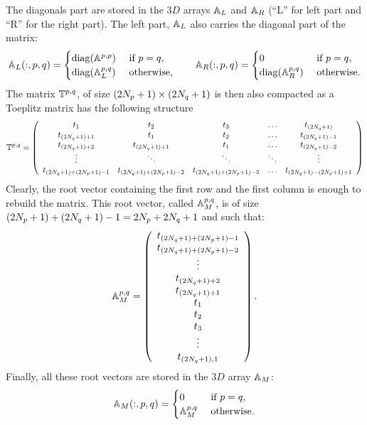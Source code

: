 The diagonals part are stored in the $3D$ arrays ${\mathbb{A}}_L$ and ${\mathbb{A}}_R$ (``L'' for left part and ``R'' for the right part). The left part, ${\mathbb{A}}_L$ also carries the diagonal part of the matrix:
$$
{\mathbb{A}}_L(:,p,q) = \begin{cases}
{\rm diag}(\mathbb{A}^{p,p}) & \text{ if }p=q,\\
{\rm diag}({\mathbb{A}}_L^{p,q}) & \text{ otherwise,}
\end{cases}\qquad
{\mathbb{A}}_R(:,p,q) = \begin{cases}
0 & \text{ if }p=q,\\
{\rm diag}({\mathbb{A}}_R^{p,q}) & \text{ otherwise.}
\end{cases}
$$
The matrix $\mathbb{T}^{p,q}$, of size $(2N_{p}+1) \times (2N_{q}+1)$ is then also compacted as a Toeplitz matrix has the following structure
$$
\mathbb{T}^{p,q} = \left(\begin{array}{c c c c c}
t_1 & t_2 & t_3 & \ldots & t_{(2N_{q}+1)} \\
t_{(2N_{q}+1)+1} & t_{1} & t_{2} & \ldots & t_{(2N_{q}+1)-1}\\
t_{(2N_{q}+1)+2} & t_{(2N_{q}+1)+1} & t_{1} & \ldots & t_{(2N_{q}+1)-2}\\
\vdots & \ddots & \ddots& \ddots& \vdots\\
t_{(2N_{q}+1)+(2N_{p}+1)-1} & t_{(2N_{q}+1)+(2N_{p}+1)-2} & t_{(2N_{q}+1)+(2N_{p}+1)-3} &   \ldots  & t_{(2N_{q}+1)-(2N_{p}+1)+1}
\end{array}\right)
$$
Clearly, the root vector containing the first row and the first column is enough to rebuild the matrix. This root vector, called ${\mathbb{A}}_M^{p,q}$, is of size $(2N_{p}+1)+ (2N_{q}+1)-1 = 2N_{p} +2N_{q}+1$ and such that:
$$
{\mathbb{A}}_M^{p,q} = \left(\begin{array}{c}
t_{(2N_{q}+1)+(2N_{p}+1)-1}\\
t_{(2N_{q}+1)+(2N_{p}+1)-2}\\
\vdots\\
t_{(2N_{q}+1)+2}\\
t_{(2N_{q}+1)+1}\\
t_{1}\\
t_{2}\\
t_{3} \\
\vdots\\
t_{(2N_{q}+1), 1}\\
\end{array}\right).
$$
Finally, all these root vectors are stored in the $3D$ array ${\mathbb{A}}_M$:
$$
{\mathbb{A}}_M(:,p,q) = \begin{cases}
0 & \text{ if }p=q,\\
{\mathbb{A}}_M^{p,q} & \text{ otherwise.}
\end{cases}
$$

